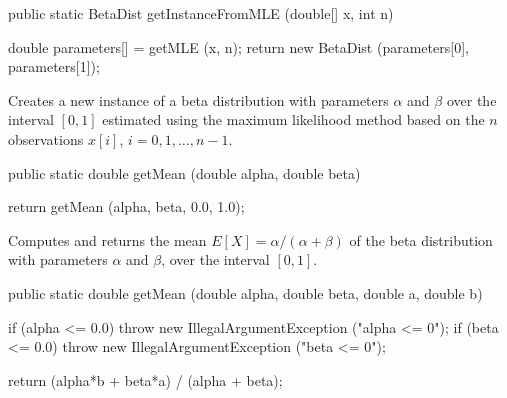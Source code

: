 \begin{htmlonly}
\end{htmlonly}
\begin{code}

   public static BetaDist getInstanceFromMLE (double[] x, int n)\begin{hide} {
      double parameters[] = getMLE (x, n);
      return new BetaDist (parameters[0], parameters[1]);
   }\end{hide}
\end{code}
\begin{tabb}
   Creates a new instance of a beta distribution with parameters $\alpha$ and
   $\beta$ over the interval $[0,1]$ estimated using the maximum likelihood
    method based on the $n$ observations $x[i]$, $i = 0, 1, \ldots, n-1$.
\end{tabb}
\begin{htmlonly}
\end{htmlonly}
\begin{code}

   public static double getMean (double alpha, double beta)\begin{hide} {
      return getMean (alpha, beta, 0.0, 1.0);
   }\end{hide}
\end{code}
\begin{tabb}  Computes and returns the mean $E[X] = \alpha / (\alpha + \beta)$
   of the beta distribution with parameters $\alpha$ and $\beta$, over the
   interval $[0, 1]$.
\end{tabb}
\begin{htmlonly}
\end{htmlonly}
\begin{code}

   public static double getMean (double alpha, double beta, double a,
                                 double b) \begin{hide} {
      if (alpha <= 0.0)
         throw new IllegalArgumentException ("alpha <= 0");
      if (beta <= 0.0)
         throw new IllegalArgumentException ("beta <= 0");

      return (alpha*b + beta*a) / (alpha + beta);
   }\end{hide}
\end{code}
